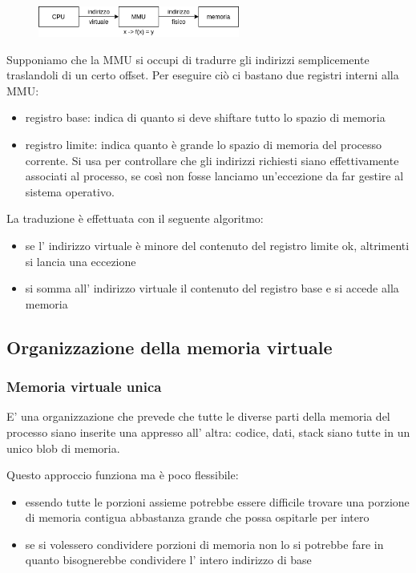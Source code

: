 \begin{figure}[H]
    \centering
    \includegraphics[width=250px]{images/9_Gestione_della_memoria/mmu.png}
\end{figure}

Supponiamo che la MMU si occupi di tradurre gli indirizzi semplicemente traslandoli di un certo offset.
Per eseguire ciò ci bastano due registri interni alla MMU:
\begin{itemize}
    \item registro base: indica di quanto si deve shiftare tutto lo spazio di memoria
    \item registro limite: indica quanto è grande lo spazio di memoria del processo corrente.
    Si usa per controllare che gli indirizzi richiesti siano effettivamente associati al processo, se così non fosse lanciamo un'eccezione da far gestire al sistema operativo.
\end{itemize}
La traduzione è effettuata con il seguente algoritmo:
\begin{itemize}
    \item se l' indirizzo virtuale è minore del contenuto del registro limite ok, altrimenti si lancia una eccezione
    \item si somma all' indirizzo virtuale il contenuto del registro base e si accede alla memoria
\end{itemize}

\subsection{Organizzazione della memoria virtuale}
\subsubsection{Memoria virtuale unica}
E' una organizzazione che prevede che tutte le diverse parti della memoria del processo siano inserite una appresso all' altra: codice, dati, stack siano tutte in un unico blob di memoria.

Questo approccio funziona ma è poco flessibile:
\begin{itemize}
    \item essendo tutte le porzioni assieme potrebbe essere difficile trovare una porzione di memoria contigua abbastanza grande che possa ospitarle per intero
    
    \item se si volessero condividere porzioni di memoria non lo si potrebbe fare in quanto bisognerebbe condividere l' intero indirizzo di base
\end{itemize}

